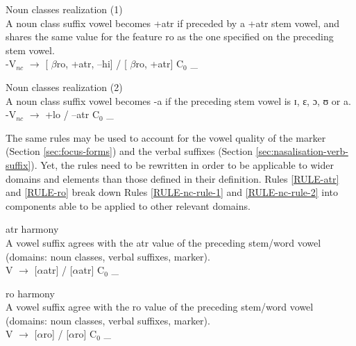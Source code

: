 \begin{Rule}\label{RULE-nc-rule-1}{\rm Noun classes realization (1)}\\
A noun class suffix vowel becomes {\sc +atr} if preceded by a {\sc +atr}
stem vowel, and shares the same value for the
feature {\sc ro}  as the one specified on the preceding stem vowel. \\
-V$_{nc}$  $\rightarrow$ [ $\beta${\sc ro},  {\sc +atr},  {\sc --hi}] 
 / [ 
$\beta${\sc ro},
{\sc +atr}] C$_0$ \_

\end{Rule}


\begin{Rule}\label{RULE-nc-rule-2}{\rm Noun classes realization (2)}\\
A noun class suffix vowel becomes {\sls -a} if the preceding stem vowel is 
{ɪ},
{ɛ}, {ɔ}, {ʊ} or {a}.\\
-V$_{nc}$ $\rightarrow$ {\sc +lo}  / {\sc --atr} C$_0$ \_ 
\end{Rule}


The same rules may be used to account for the vowel
quality of the  marker (Section \ref{sec:focus-forms}) and  the verbal
suffixes (Section \ref{sec:nasalisation-verb-suffix}). Yet, the rules need to be rewritten in order to be  applicable to wider domains and elements than those defined in their definition. Rules \ref{RULE-atr} and \ref{RULE-ro} break down Rules \ref{RULE-nc-rule-1} and \ref{RULE-nc-rule-2} into components able to be applied to other relevant domains.



\begin{Rule}\label{RULE-atr}{{\sc atr} harmony}\\
A vowel suffix agrees with the {\sc atr} value of   the preceding stem/word 
vowel (domains: noun classes, verbal suffixes,  marker).\\
V $\rightarrow$ $[\alpha${\sc atr}$]$  / $[\alpha${\sc atr}$]$ C$_0$ \_
\end{Rule}


\begin{Rule}\label{RULE-ro}{{\sc ro} harmony}\\
A vowel suffix  agree with the {\sc ro} value of  the   preceding stem/word
 vowel (domains: noun classes, verbal suffixes,  marker).\\
V $\rightarrow$ [$\alpha${\sc ro}]  / [$\alpha${\sc ro}] C$_0$ \_
\end{Rule}

